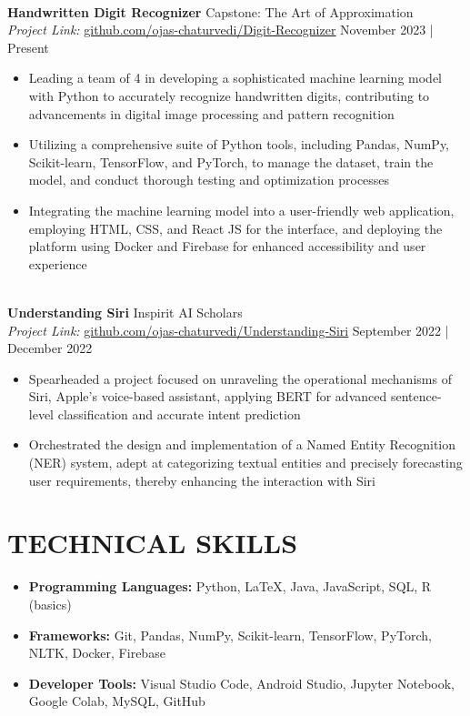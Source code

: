 \documentclass[a4paper,10pt]{extarticle}
\begin{document}
\noindent
\\ \textbf{Handwritten Digit Recognizer} \hfill Capstone: The Art of Approximation \\
\textit{Project Link:} \href{https://github.com/ojas-chaturvedi/Digit-Recognizer}{\underline{github.com/ojas-chaturvedi/Digit-Recognizer}} \hfill November 2023 | Present
\begin{itemize}
    \item Leading a team of 4 in developing a sophisticated machine learning model with Python to accurately recognize handwritten digits, contributing to advancements in digital image processing and pattern recognition
    \item Utilizing a comprehensive suite of Python tools, including Pandas, NumPy, Scikit-learn, TensorFlow, and PyTorch, to manage the dataset, train the model, and conduct thorough testing and optimization processes
    \item Integrating the machine learning model into a user-friendly web application, employing HTML, CSS, and React JS for the interface, and deploying the platform using Docker and Firebase for enhanced accessibility and user experience
\end{itemize}

\noindent
\\ \textbf{Understanding Siri} \hfill Inspirit AI Scholars \\
\textit{Project Link:} \href{https://github.com/ojas-chaturvedi/Understanding-Siri}{\underline{github.com/ojas-chaturvedi/Understanding-Siri}} \hfill September 2022 | December 2022
\begin{itemize}
    \item Spearheaded a project focused on unraveling the operational mechanisms of Siri, Apple's voice-based assistant, applying BERT for advanced sentence-level classification and accurate intent prediction
    \item Orchestrated the design and implementation of a Named Entity Recognition (NER) system, adept at categorizing textual entities and precisely forecasting user requirements, thereby enhancing the interaction with Siri
\end{itemize}

\section*{TECHNICAL SKILLS}
\begin{itemize}
    \item \textbf{Programming Languages:} Python, LaTeX, Java, JavaScript, SQL, R (basics)
    \item \textbf{Frameworks:} Git, Pandas, NumPy, Scikit-learn, TensorFlow, PyTorch, NLTK, Docker, Firebase
    \item \textbf{Developer Tools:} Visual Studio Code, Android Studio, Jupyter Notebook, Google Colab, MySQL, GitHub
\end{itemize}

\end{document}
